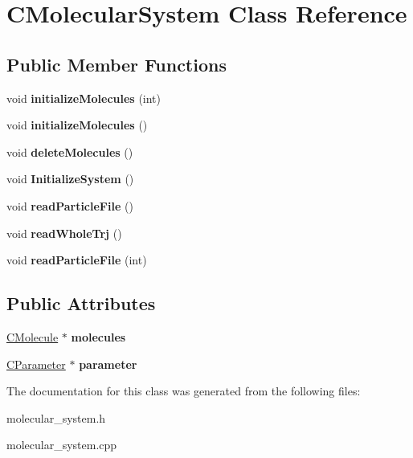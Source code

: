 \hypertarget{classCMolecularSystem}{}\section{C\+Molecular\+System Class Reference}
\label{classCMolecularSystem}
\subsection*{Public Member Functions}
\begin{DoxyCompactItemize}
\item 
\mbox{\label{classCMolecularSystem_afcebd0d1032cbe262c82825ceb78b4a5}} 
void {\bfseries initialize\+Molecules} (int)
\item 
\mbox{\label{classCMolecularSystem_a3635729781d41229ce16fabea4ce9b6f}} 
void {\bfseries initialize\+Molecules} ()
\item 
\mbox{\label{classCMolecularSystem_a5a31541d610fe40d42a31283eb9a8845}} 
void {\bfseries delete\+Molecules} ()
\item 
\mbox{\label{classCMolecularSystem_a9084e19d4554f70ae7e603c7cab3a2ae}} 
void {\bfseries Initialize\+System} ()
\item 
\mbox{\label{classCMolecularSystem_a019709e83f903659bdb82c226da4189a}} 
void {\bfseries read\+Particle\+File} ()
\item 
\mbox{\label{classCMolecularSystem_a68c2be35fb9f9dbd1915ddf1c845eb15}} 
void {\bfseries read\+Whole\+Trj} ()
\item 
\mbox{\label{classCMolecularSystem_a7ccd08c6a0182faf0316d9f1f8ec1651}} 
void {\bfseries read\+Particle\+File} (int)
\end{DoxyCompactItemize}
\subsection*{Public Attributes}
\begin{DoxyCompactItemize}
\item 
\mbox{\label{classCMolecularSystem_a1431a8bd6aa95b62a025afdca53d9e1c}} 
\mbox{\hyperlink{classCMolecule}{C\+Molecule}} $\ast$ {\bfseries molecules}
\item 
\mbox{\label{classCMolecularSystem_a4139e417a2b508576800fc44ce691db2}} 
\mbox{\hyperlink{classCParameter}{C\+Parameter}} $\ast$ {\bfseries parameter}
\end{DoxyCompactItemize}


The documentation for this class was generated from the following files\+:\begin{DoxyCompactItemize}
\item 
molecular\+\_\+system.\+h\item 
molecular\+\_\+system.\+cpp\end{DoxyCompactItemize}
